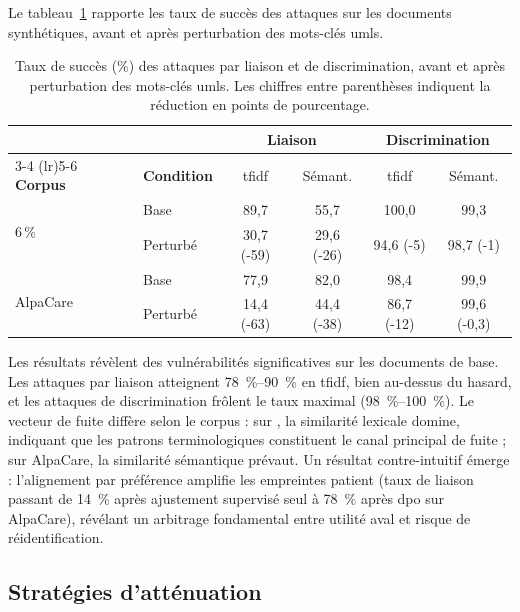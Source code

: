 Le tableau~\ref{tab:privacy-combined} rapporte les taux de succès des attaques sur les documents synthétiques, avant et après perturbation des mots-clés \gls{umls}.

\begin{table}[htbp]
\centering
\small
\begin{tabular}{llcccc}
\toprule
 & & \multicolumn{2}{c}{\textbf{Liaison}} & \multicolumn{2}{c}{\textbf{Discrimination}} \\
\cmidrule(lr){3-4} \cmidrule(lr){5-6}
\textbf{Corpus} & \textbf{Condition} & \gls{tfidf} & Sémant. & \gls{tfidf} & Sémant. \\
\midrule
\multirow{2}{*}{\mimic{} 6\,\%}
    & Base        & 89,7 & 55,7 & 100,0 & 99,3 \\
    & Perturbé    & 30,7 \scriptsize(-59) & 29,6 \scriptsize(-26) & 94,6 \scriptsize(-5) & 98,7 \scriptsize(-1) \\
\midrule
\multirow{2}{*}{AlpaCare}
    & Base        & 77,9 & 82,0 & 98,4 & 99,9 \\
    & Perturbé    & 14,4 \scriptsize(-63) & 44,4 \scriptsize(-38) & 86,7 \scriptsize(-12) & 99,6 \scriptsize(-0,3) \\
\bottomrule
\end{tabular}
\caption{Taux de succès (\%) des attaques par liaison et de discrimination, avant et après perturbation des mots-clés \gls{umls}. Les chiffres entre parenthèses indiquent la réduction en points de pourcentage.}
\label{tab:privacy-combined}
\end{table}

Les résultats révèlent des vulnérabilités significatives sur les documents de base.
Les attaques par liaison atteignent \SIrange{78}{90}{\percent} en \gls{tfidf}, bien au-dessus du hasard, et les attaques de discrimination frôlent le taux maximal (\SIrange{98}{100}{\percent}).
Le vecteur de fuite diffère selon le corpus : sur \mimic{}, la similarité lexicale domine, indiquant que les patrons terminologiques constituent le canal principal de fuite ; sur AlpaCare, la similarité sémantique prévaut.
Un résultat contre-intuitif émerge : l'alignement par préférence amplifie les empreintes patient (taux de liaison passant de \SI{14}{\percent} après ajustement supervisé seul à \SI{78}{\percent} après \gls{dpo} sur AlpaCare), révélant un arbitrage fondamental entre utilité aval et risque de réidentification.

\subsection{Stratégies d'atténuation}

